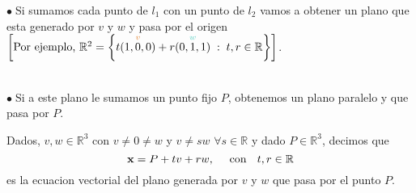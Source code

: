 \documentclass{article}
\theoremstyle{definition}
\theoremstyle{definition}
\theoremstyle{remark}
\newcommand\bl{$\bullet\;$}
\begin{document}
\begin{figure}[h]
\centering
\def\svgwidth{0.75\textwidth}

\end{figure}
\pagebreak
\bl Si sumamos cada punto de $l_1$ con un punto de $l_2$ vamos a obtener un plano que esta generado por $v$ y $w$ y pasa por el origen $\left[\text{Por ejemplo, }\mathbb{R}^2=\left\{t\overset{\textcolor{rojop2}{v}}{(1,0,0)}+r\overset{\textcolor{verdep2}{w}}{(0,1,1)}\; : \; t,r \in \mathbb{R}\right\}\right]$.
\begin{figure}[h]
\centering
\def\svgwidth{0.75\textwidth}

\end{figure}
\\
\bl Si a este plano le sumamos un punto fijo $P$, obtenemos un plano paralelo y que pasa por $P$.
\begin{defi}
  Dados, $v,w \in \mathbb{R}^3$ con $v \neq 0 \neq w$ y $v \neq sw $ $\forall s \in \mathbb{R}$ y dado $P \in \mathbb{R}^3$, decimos que \[ 
    \mathbf{x}=P+tv+rw, \text{ \quad con \; } t,r \in \mathbb{R} 
  \] es la ecuacion vectorial del plano generada por $v$ y $w$ que pasa por el punto $P$.
\end{defi}
\end{document}

